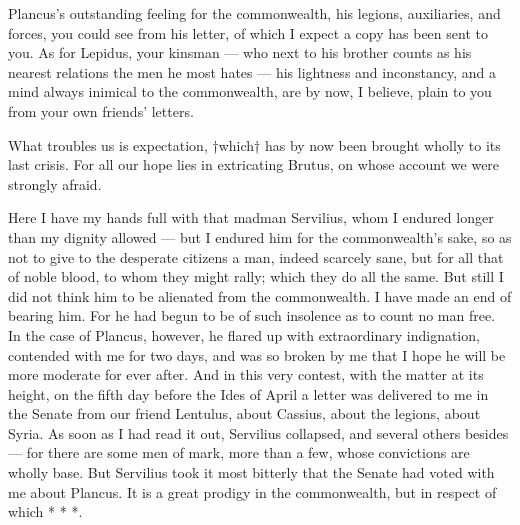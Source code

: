 

 Plancus's outstanding feeling for the commonwealth, his legions, auxiliaries, and forces, you could see from his letter, of which I expect a copy has been sent to you. As for Lepidus, your kinsman --- who next to his brother counts as his nearest relations the men he most hates --- his lightness and inconstancy, and a mind always inimical to the commonwealth, are by now, I believe, plain to you from your own friends' letters.

 What troubles us is expectation, †which† has by now been brought wholly to its last crisis. For all our hope lies in extricating Brutus, on whose account we were strongly afraid.

 Here I have my hands full with that madman Servilius, whom I endured longer than my dignity allowed --- but I endured him for the commonwealth's sake, so as not to give to the desperate citizens a man, indeed scarcely sane, but for all that of noble blood, to whom they might rally; which they do all the same. But still I did not think him to be alienated from the commonwealth. I have made an end of bearing him. For he had begun to be of such insolence as to count no man free. In the case of Plancus, however, he flared up with extraordinary indignation, contended with me for two days, and was so broken by me that I hope he will be more moderate for ever after. And in this very contest, with the matter at its height, on the fifth day before the Ides of April a letter was delivered to me in the Senate from our friend Lentulus, about Cassius, about the legions, about Syria. As soon as I had read it out, Servilius collapsed, and several others besides --- for there are some men of mark, more than a few, whose convictions are wholly base. But Servilius took it most bitterly that the Senate had voted with me about Plancus. It is a great prodigy in the commonwealth, but in respect of which * * *.
